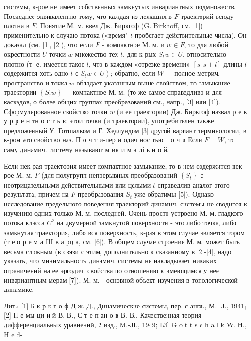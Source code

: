 \documentclass[10pt]{article}
\begin{document}
системы, к-рое не имеет собственных замкнутых инвариантных подмножеств. Последнее эквивалентно тому, что каждая из лежащих в $F$ траекторий всюду плотна в $F$. Понятие М. м. ввел Дж. Биркгоф (G. Birkhoff, см. [1]) применительно к случаю потока («время" $t$ пробегает действительные числа). Он доказал (см. [1], [2]), что если $F$ - компактное М. м. и $w \in F$, то для любой окрестности $U$ точки $w$ множество тех $t$, для к-рых $S_{t} w \in U$, относительно плотно (т. е. имеется такое $l$, что в каждом «отрезке времени» $[s, s+l]$ длины $l$ содержится хоть одно $t$ с $\left.S_{t} w \in U\right)$; обратно, если $W-$ полное метрич. пространство и точка $w$ обладает указанным выше свойством, то замыкание траектории $\left\{S_{t} w\right\}-$ компактное М. м. (то же самое справедливо и для каскадов; о более общих группах преобразований см., напр., [3] или [4]). Сформулированное свойство точки $w$ (и ее траектории) Дж. Биркгоф назвал р е к у р р е н тн о с т ь ю этой точки (и траектории), употребителен также предложенный У. Готшалком и Г. Хедлундом [3] другой вариант терминологии, в к-ром әто свойство наз. П о ч т и-пер и одич нос тью т о ч и Если $F=W$, то саму динамич. систему называют м ин и м а лі ь н о й.



Если нек-рая траектория имеет компактное замыкание, то в нем содержится нек-рое М. м. $F$ (для полугрупп непрерывных преобразований $\left\{S_{t}\right\}$ с неотрицательными действительными или целыми $t$ справедлив аналог этого результата, причем на $F$ преобразования $S_{t}$ уже обратимы [5]). Однако исследование предельного поведения траекторий динамич. системы не сводится к изучению одних только М. м. последней. Очень просто устроено М. м. гладкого потока класса $C^{2}$ на двумерной замкнутой поверхности - это либо точка, либо замкнутая траектория, либо вся поверхность, к-рая в этом случае является тором (т е о р е м а III в а рц а, см. [6]). В общем случае строение М. м. может быть весьма сложным (в связи с этим, дополнительно к сказанному в [2]-[4], надо указать, что минимальность динамич. системы не накладывает никаких ограничений на ее эргодич. свойства по отношению к имеющимся у нее инвариантным мерам [7]). М. м. - основной объект изучения в топологической динамике.



Лит.: [1] Б к р к г о ф Д ж. Д., Динамические системы, пер. с англ., М.- J., 1941; [2] Н е мы ци и й В. В., С т е п ан о в В. В., Качественная теория дифференциальных уравнений, 2 изд., M.-JI., 1949; L3] G o t t s c h a l k W. H., H e d-
\end{document}
